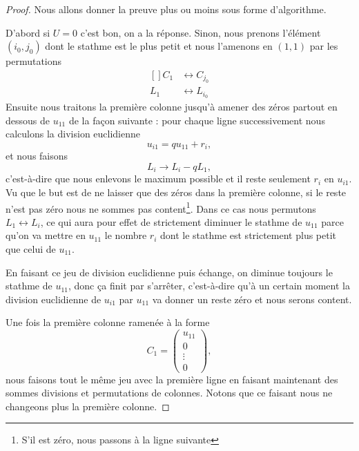 \begin{proof}
    Nous allons donner la preuve plus ou moins sous forme d'algorithme.

    D'abord si \( U=0\) c'est bon, on a la réponse. Sinon, nous prenons l'élément \( (i_0,j_0)\) dont le stathme est le plus petit et nous l'amenons en \( (1,1)\) par les permutations
    \begin{equation}
        \begin{aligned}[]
            C_1&\leftrightarrow C_{j_0}\\
            L_1&\leftrightarrow L_{i_0}
        \end{aligned}
    \end{equation}
    Ensuite nous traitons la première colonne jusqu'à amener des zéros partout en dessous de \( u_{11}\) de la façon suivante : pour chaque ligne successivement nous calculons la division euclidienne
    \begin{equation}
        u_{i1}=qu_{11}+r_i,
    \end{equation}
    et nous faisons
    \begin{equation}
        L_i\to L_i-qL_1,
    \end{equation}
    c'est-à-dire que nous enlevons le maximum possible et il reste seulement \( r_i\) en \( u_{i1}\). Vu que le but est de ne laisser que des zéros dans la première colonne, si le reste n'est pas zéro nous ne sommes pas content\footnote{S'il est zéro, nous passons à la ligne suivante}. Dans ce cas nous permutons \( L_1\leftrightarrow L_i\), ce qui aura pour effet de strictement diminuer le stathme de \( u_{11}\) parce qu'on va mettre en \( u_{11}\) le nombre \( r_i\) dont le stathme est strictement plus petit que celui de \( u_{11}\).

    En faisant ce jeu de division euclidienne puis échange, on diminue toujours le stathme de \( u_{11}\), donc ça finit par s'arrêter, c'est-à-dire qu'à un certain moment la division euclidienne de \( u_{i1}\) par \( u_{11}\) va donner un reste zéro et nous serons content.

    Une fois la première colonne ramenée à la forme
    \begin{equation}
        C_1=\begin{pmatrix}
            u_{11}    \\
            0    \\
            \vdots    \\
            0
        \end{pmatrix},
    \end{equation}
    nous faisons tout le même jeu avec la première ligne en faisant maintenant des sommes divisions et permutations de colonnes. Notons que ce faisant nous ne changeons plus la première colonne.


\end{proof}

